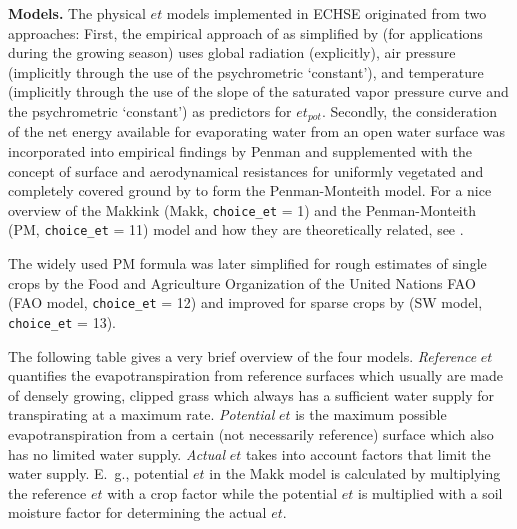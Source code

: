 \documentclass{scrreprt}
\begin{document}
\textbf{Models.}
The physical $et$ models implemented in ECHSE originated from two approaches:
First, the empirical approach of \citet{makkink57} as simplified by \citet{debruin87} (for applications during the growing season) uses global radiation (explicitly), air pressure (implicitly through the use of the psychrometric `constant'), and temperature (implicitly through the use of the slope of the saturated vapor pressure curve and the psychrometric `constant') as predictors for $et_{pot}$.
Secondly, the consideration of the net energy available for evaporating water from an open water surface was incorporated into empirical findings by Penman and supplemented with the concept of surface and aerodynamical resistances for uniformly vegetated and completely covered ground by \citet{monteith65} to form the Penman-Monteith model.
For a nice overview of the Makkink (Makk, \verb!choice_et! = 1) and the Penman-Monteith (PM, \verb!choice_et! = 11) model and how they are theoretically related, see \citet{debruin87}.

The widely used PM formula was later simplified for rough estimates of single crops by the Food and Agriculture Organization of the United Nations FAO \citep{fao98} (FAO model, \verb!choice_et! = 12) and improved for sparse crops by \citet{shuttleworth85} (SW model, \verb!choice_et! = 13).

The following table gives a very brief overview of the four models.
\emph{Reference} $et$ quantifies the evapotranspiration from reference surfaces which usually are made of densely growing, clipped grass which always has a sufficient water supply for transpirating at a maximum rate.
\emph{Potential} $et$ is the maximum possible evapotranspiration from a certain (not necessarily reference) surface which also has no limited water supply.
\emph{Actual} $et$ takes into account factors that limit the water supply.
E.\ g., potential $et$ in the Makk model is calculated by multiplying the reference $et$ with a crop factor while the potential $et$ is multiplied with a soil moisture factor for determining the actual $et$.
\end{document}
